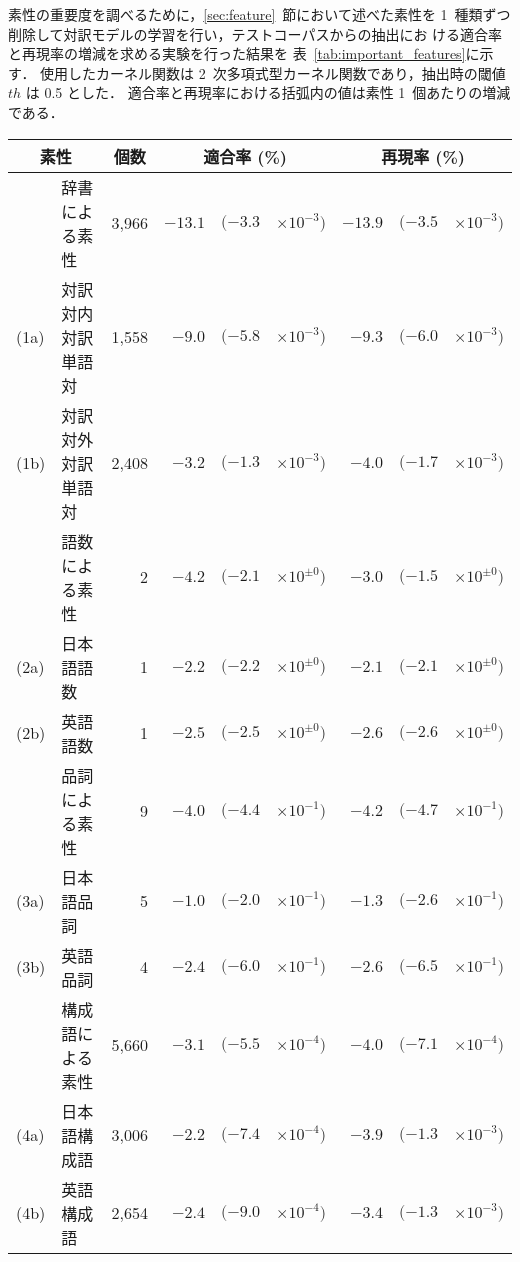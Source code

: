 素性の重要度を調べるために，\ref{sec:feature}~節において述べた素性を
1~種類ずつ削除して対訳モデルの学習を行い，テストコーパスからの抽出にお
ける適合率と再現率の増減を求める実験を行った結果を
表~\ref{tab:important_features}に示す．
使用したカーネル関数は 2~次多項式型カーネル関数であり，抽出時の閾値 $th$
は 0.5 とした．
適合率と再現率における括弧内の値は素性 1~個あたりの増減である．
\begin{table*}[tbp]
  \centering
  \caption{素性を削除した時の適合率と再現率の増減}
  \label{tab:important_features}
  {\small
  \begin{tabular}{|ll|r|rr@{}l|rr@{}l|} \hline
    \multicolumn{2}{|c|}{素性} &
    \multicolumn{1}{c|}{個数} &
    \multicolumn{3}{c|}{適合率 (\%)} &
    \multicolumn{3}{c|}{再現率 (\%)} \\ \hline\hline

    & 辞書による素性 & 3,966 &
    $-13.1$ & $(-3.3$ & $\times 10^{-3})$ &
    $-13.9$ & $(-3.5$ & $\times 10^{-3})$\\ \hline
    (1a) & 対訳対内対訳単語対 & 1,558 &
    $-9.0$ & $(-5.8$ & $\times 10^{-3})$ &
    $-9.3$ & $(-6.0$ & $\times 10^{-3})$ \\
    (1b) & 対訳対外対訳単語対 & 2,408 &
    $-3.2$ & $(-1.3$ & $\times 10^{-3})$ &
    $-4.0$ & $(-1.7$ & $\times 10^{-3})$ \\ \hline\hline

    & 語数による素性 & 2 &
    $-4.2$ & $(-2.1$ & $\times 10^{\pm 0})$ &
    $-3.0$ & $(-1.5$ & $\times 10^{\pm 0})$ \\ \hline
    (2a) & 日本語語数 & 1 &
    $-2.2$ & $(-2.2$ & $\times 10^{\pm 0})$ &
    $-2.1$ & $(-2.1$ & $\times 10^{\pm 0})$ \\
    (2b) & 英語語数 & 1 &
    $-2.5$ & $(-2.5$ & $\times 10^{\pm 0})$ &
    $-2.6$ & $(-2.6$ & $\times 10^{\pm 0})$ \\ \hline\hline

    & 品詞による素性 & 9 &
    $-4.0$ & $(-4.4$ & $\times 10^{-1})$ &
    $-4.2$ & $(-4.7$ & $\times 10^{-1})$ \\ \hline
    (3a) & 日本語品詞 & 5 &
    $-1.0$ & $(-2.0$ & $\times 10^{-1})$ &
    $-1.3$ & $(-2.6$ & $\times 10^{-1})$ \\
    (3b) & 英語品詞 & 4 &
    $-2.4$ & $(-6.0$ & $\times 10^{-1})$ &
    $-2.6$ & $(-6.5$ & $\times 10^{-1})$ \\ \hline\hline

    & 構成語による素性 & 5,660 &
    $-3.1$ & $(-5.5$ & $\times 10^{-4})$ &
    $-4.0$ & $(-7.1$ & $\times 10^{-4})$ \\ \hline
    (4a) & 日本語構成語 & 3,006 &
    $-2.2$ & $(-7.4$ & $\times 10^{-4})$ &
    $-3.9$ & $(-1.3$ & $\times 10^{-3})$ \\
    (4b) & 英語構成語 & 2,654 &
    $-2.4$ & $(-9.0$ & $\times 10^{-4})$ &
    $-3.4$ & $(-1.3$ & $\times 10^{-3})$ \\ \hline\hline


\end{tabular}}
\end{table*}
